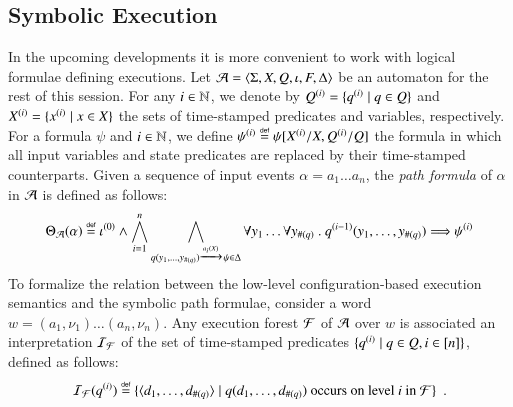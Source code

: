 \documentclass{llncs}
\begin{document}
\subsection{Symbolic Execution}

In the upcoming developments it is more convenient to work with
logical formulae defining executions. Let $\mathcal{A} =
\langle \Sigma,X,Q,\iota,F,\Delta \rangle$ be an automaton for the rest of
this session. For any $i \in {\bf \mathbb{N}}$, we denote by ${Q}^{({i})} =
\{ {q}^{({i})} \mid q \in Q \}$ and ${X}^{({i})} = \{ {x}^{({i})}
  \mid x \in X \}$ the sets of time-stamped predicates and variables,
respectively. For a formula $\psi$ and $i \in {\bf \mathbb{N}}$, we define
${\psi}^{({i})} \stackrel{\scriptscriptstyle{\mathsf{def}}}{=} \psi[{X}^{({i})}/X,{Q}^{({i})}/Q]$ the
formula in which all input variables and state predicates are replaced
by their time-stamped counterparts. Given a sequence of input events
$\alpha = a_1 \ldots a_n$, the \emph{path formula} of $\alpha$ in $\mathcal{A}$
is defined as follows:
\[\Theta_{\mathcal{A}}({\alpha}) \stackrel{\scriptscriptstyle{\mathsf{def}}}{=} {\iota}^{({0})} \wedge 
\bigwedge_{i=1}^n \bigwedge_{q(y_1,\ldots,y_{\#(q)}) \xrightarrow{{\scriptscriptstyle a_i(X)}}_{{\scriptstyle }}
  \psi \in \Delta} \forall y_1 \ldots \forall y_{\#(q)} ~.~
{q}^{({i-1})}(y_1,\ldots,y_{\#(q)}) \Longrightarrow {\psi}^{({i})}\]
To formalize the relation between the low-level configuration-based
execution semantics and the symbolic path formulae, consider a word
$w=(a_1,\nu_1) \ldots (a_n,\nu_n)$. Any execution forest $\mathcal{F}$ of $\mathcal{A}$
over $w$ is associated an interpretation $\mathcal{I}_{\mathcal{F}}$ of the set of
time-stamped predicates $\{ {q}^{({i})} \mid q \in Q, i \in [n] \}$,
defined as follows:
\[\mathcal{I}_{\mathcal{F}}({q}^{({i})}) \stackrel{\scriptscriptstyle{\mathsf{def}}}{=} \{ \langle d_1,\ldots,d_{\#(q)} \rangle
  \mid q(d_1,\ldots,d_{\#(q)}) \text{ occurs on level $i$ in
    $\mathcal{F}$} \}\enspace.\]
\end{document}
